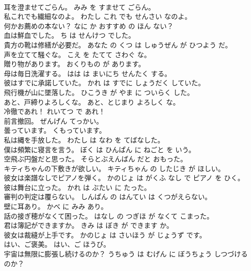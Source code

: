 \documentclass[8pt]{extreport}
\begin{document}
\begin{CJK}{UTF8}{min}
\\	耳を澄ませてごらん。	みみ を すませて ごらん。	
\\	私これでも繊細なのよ。	わたし これ でも せんさい なのよ。	
\\	何かお薦めの本ない？	なに か おすすめ の ほん ない？	
\\	血は鮮血でした。	ち は せんけつ でした。	
\\	貴方の靴は修繕が必要だ。	あなた の くつ は しゅうぜん が ひつよう だ。	
\\	声を立てて騒ぐな。	こえ を たてて さわぐ な。	
\\	贈り物があります。	おくりもの が あります。	
\\	母は毎日洗濯する。	はは は まいにち せんたく する。	
\\	彼はすでに承諾していた。	かれ は すでに しょうだく していた。	
\\	飛行機が山に墜落した。	ひこうき が やま に ついらく した。	
\\	あと、戸締りよろしくな。	あと、とじまり よろしく な。	
\\	冷徹であれ！	れいてつ で あれ！	
\\	前言撤回。	ぜんげん てっかい。	
\\	曇っています。	くもっています。	
\\	私は縄を手放した。	わたし は なわ を てばなした。	
\\	僕は頻繁に寝言を言う。	ぼく は ひんぱん に ねごと を いう。	
\\	空飛ぶ円盤だと思った。	そらとぶえんばん だと おもった。	
\\	キティちゃんの下敷きが欲しい。	キティちゃん の したじき が ほしい。	
\\	彼女は楽譜なしでピアノを弾く。	かのじょ は がくふ なし で ピアノ を ひく。	
\\	彼は舞台に立った。	かれ は ぶたい に たった。	
\\	審判の判定は覆らない。	しんぱん の はんてい は くつがえらない。	
\\	壁に耳あり。	かべ に みみ あり。	
\\	話の接ぎ穂がなくて困った。	はなし の つぎほ が なくて こまった。	
\\	君は簿記ができますか。	きみ は ぼき が できます か。	
\\	彼女は裁縫が上手です。	かのじょ は さいほう が じょうず です。	
\\	はい、ご褒美。	はい、ご ほうび。	
\\	宇宙は無限に膨張し続けるのか？	うちゅう は むげん に ぼうちょう しつづける のか？	

\end{CJK}
\end{document}
